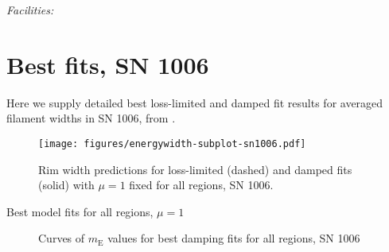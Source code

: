 \documentclass[iop, apj, numberedappendix]{emulateapj}
\newcommand*{\mt}{\mathrm}
\newcommand*{\mE}{m_\mt{E}}
\begin{document}
{\it Facilities:} 

\clearpage
\appendix

\setcounter{table}{0}
\renewcommand{\thetable}{A\arabic{table}}
\setcounter{figure}{0}
\renewcommand{\thefigure}{A\arabic{figure}}

%
%    

\section{Best fits, SN 1006}

Here we supply detailed best loss-limited and damped fit results for averaged
filament widths in SN 1006, from \citet{ressler2014}.

\begin{figure*}[h]
    \centering
    \texttt{[image: figures/energywidth-subplot-sn1006.pdf]}
    \caption{Rim width predictions for loss-limited (dashed) and damped fits
        (solid) with $\mu = 1$ fixed for all regions, SN 1006.}
\end{figure*}

\begin{table}[h]
    \footnotesize
    \centering
    \caption{Best model fits for all regions, $\mu = 1$}
    
\end{table}

\clearpage
\begin{figure}
    \centering
    \iftoggle{manuscript}{
        \texttt{[image: figures/mE-damp-sn1006.pdf]}
    }{
        \texttt{[image: figures/mE-damp-sn1006.pdf]}
    }
    \caption{Curves of $\mE$ values for best damping fits for all regions,
        SN 1006}
\end{figure}
\end{document}

